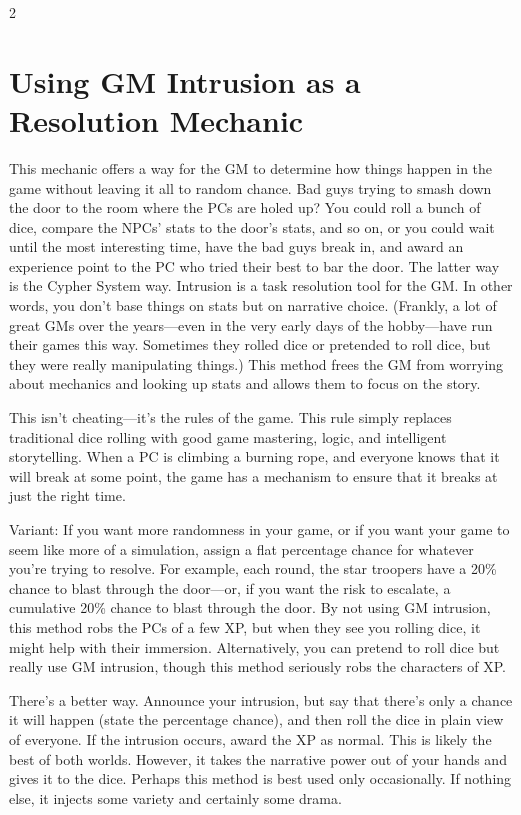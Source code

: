 \begin{multicols}{2}
\section{Using GM Intrusion as a Resolution Mechanic}
 
This mechanic offers a way for the GM to determine how things happen in the game without leaving it all to random chance. Bad guys trying to smash down the door to the room where the PCs are holed up? You could roll a bunch of dice, compare the NPCs’ stats to the door’s stats, and so on, or you could wait until the most interesting time, have the bad guys break in, and award an experience point to the PC who tried their best to bar the door. The latter way is the Cypher System way. Intrusion is a task resolution tool for the GM. In other words, you don’t base things on stats but on narrative choice. (Frankly, a lot of great GMs over the years—even in the very early days of the hobby—have run their games this way. Sometimes they rolled dice or pretended to roll dice, but they were really manipulating things.) This method frees the GM from worrying about mechanics and looking up stats and allows them to focus on the story.

This isn’t cheating—it’s the rules of the game. This rule simply replaces traditional dice rolling with good game mastering, logic, and intelligent storytelling. When a PC is climbing a burning rope, and everyone knows that it will break at some point, the game has a mechanism to ensure that it breaks at just the right time.

Variant: If you want more randomness in your game, or if you want your game to seem like more of a simulation, assign a flat percentage chance for whatever you’re trying to resolve. For example, each round, the star troopers have a 20\% chance to blast through the door—or, if you want the risk to escalate, a cumulative 20\% chance to blast through the door. By not using GM intrusion, this method robs the PCs of a few XP, but when they see you rolling dice, it might help with their immersion. Alternatively, you can pretend to roll dice but really use GM intrusion, though this method seriously robs the characters of XP.

There’s a better way. Announce your intrusion, but say that there’s only a chance it will happen (state the percentage chance), and then roll the dice in plain view of everyone. If the intrusion occurs, award the XP as normal. This is likely the best of both worlds. However, it takes the narrative power out of your hands and gives it to the dice. Perhaps this method is best used only occasionally. If nothing else, it injects some variety and certainly some drama.


\end{multicols}
